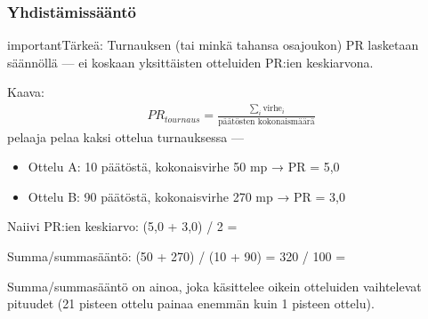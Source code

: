 \documentclass[letterpaper,10pt,finnish]{sphinxmanual}
\begin{document}
\subsubsection{Yhdistämissääntö}
\label{\detokenize{manuel:regle-d-agregation}}
\begin{sphinxadmonition}{important}{Tärkeä:}
\sphinxAtStartPar
Turnauksen (tai minkä tahansa osajoukon) PR lasketaan \sphinxhyphen{}säännöllä — ei koskaan yksittäisten otteluiden PR:ien keskiarvona.

\sphinxAtStartPar
Kaava:
\begin{equation*}
\begin{split}PR_{tournaus} = \frac{\sum_{i} \text{virhe}_i}{\text{päätösten kokonaismäärä}}\end{split}
\end{equation*}
\sphinxAtStartPar
{} pelaaja pelaa kaksi ottelua turnauksessa —
\begin{itemize}
\item {} 
\sphinxAtStartPar
Ottelu A: 10 päätöstä, kokonaisvirhe 50 mp → PR = 5,0

\item {} 
\sphinxAtStartPar
Ottelu B: 90 päätöstä, kokonaisvirhe 270 mp → PR = 3,0

\end{itemize}

\sphinxAtStartPar
Naiivi PR:ien keskiarvo: (5,0 + 3,0) / 2 =  

\sphinxAtStartPar
Summa/summa\sphinxhyphen{}sääntö: (50 + 270) / (10 + 90) = 320 / 100 =  

\sphinxAtStartPar
Summa/summa\sphinxhyphen{}sääntö on ainoa, joka käsittelee oikein otteluiden vaihtelevat pituudet (21 pisteen ottelu painaa enemmän kuin 1 pisteen ottelu).
\end{sphinxadmonition}
\end{document}
